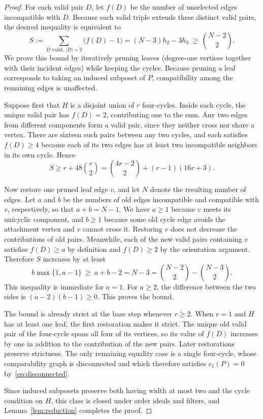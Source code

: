 \documentclass[11pt]{amsart}
\theoremstyle{remark}
\numberwithin{equation}{section}
\newcommand{\lin}{c_1}
\begin{document}
\begin{proof}
For each valid pair $D$, let $f(D)$ be the number of unselected edges
incompatible with $D$. Because each valid triple extends three distinct valid
pairs, the desired inequality is equivalent to
\[
 S:=\sum_{D\text{ valid},\ |D|=2}\bigl(f(D)-1\bigr)=(N-3)h_2-3h_3\ \ge\ \binom{N-2}{2}.
\]
We prove this bound by iteratively pruning leaves (degree-one vertices together
with their incident edges) while keeping the cycles. Because pruning a leaf
corresponds to taking an induced subposet of $P$, compatibility among the
remaining edges is unaffected.

Suppose first that $H$ is a disjoint union of $r$ four-cycles. Inside each
cycle, the unique valid pair has $f(D)=2$, contributing one to the sum. Any two
edges from different components form a valid pair, since they neither cross nor
share a vertex. There are sixteen such pairs between any two cycles, and each
satisfies $f(D)\ge4$ because each of its two edges has at least two
incompatible neighbors in its own cycle. Hence
\[
 S\ge r+48\binom r2=\binom{4r-2}{2}+(r-1)(16r+3).
\]

Now restore one pruned leaf edge $v$, and let $N$ denote the resulting number
of edges. Let $a$ and $b$ be the numbers of old edges incompatible and
compatible with $v$, respectively, so that $a+b=N-1$. We have $a\ge1$ because
$v$ meets its unicyclic component, and $b\ge1$ because some old cycle edge
avoids the attachment vertex and $v$ cannot cross it. Restoring $v$ does not
decrease the contributions of old pairs. Meanwhile, each of the new valid pairs
containing $v$ satisfies $f(D)\ge a$ by definition and $f(D)\ge2$ by the
orientation argument. Therefore $S$ increases by at least
\[
 b\max\{1,a-1\}\ \ge\ a+b-2=N-3=\binom{N-2}{2}-\binom{N-3}{2}.
\]
This inequality is immediate for $a=1$. For $a\ge2$, the difference between the
two sides is $(a-2)(b-1)\ge0$. This proves the bound.

The bound is already strict at the base step whenever $r\ge2$. When $r=1$ and
$H$ has at least one leaf, the first restoration makes it strict. The unique
old valid pair of the four-cycle spans all four of its vertices, so its value
of $f(D)$ increases by one in addition to the contribution of the new pairs.
Later restorations preserve strictness. The only remaining equality case is
a single four-cycle, whose comparability graph is disconnected and which
therefore satisfies $\lin(P)=0$ by~\eqref{eq:disconnected}.

Since induced subposets preserve both having width at most two and the cycle
condition on $H$, this class is closed under order ideals and filters, and
Lemma~\ref{lem:reduction} completes the proof.
\end{proof}
\end{document}
